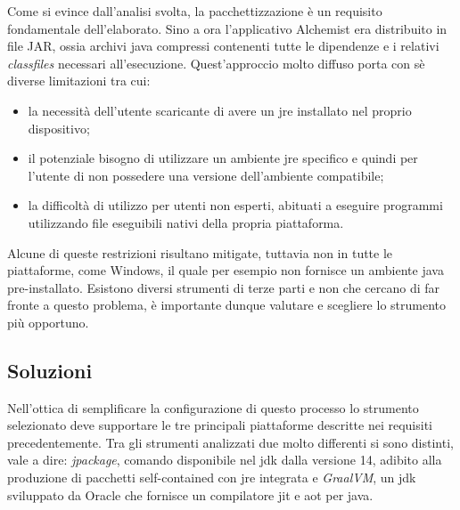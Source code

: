 Come si evince dall'analisi svolta, la pacchettizzazione è un requisito fondamentale dell'elaborato. Sino a ora l'applicativo Alchemist era distribuito in file JAR, ossia archivi java compressi contenenti tutte le dipendenze e i relativi \textit{classfiles} necessari all'esecuzione. Quest'approccio molto diffuso porta con sè diverse limitazioni tra cui:
\begin{itemize}
	\item la necessità dell'utente scaricante di avere un \ac{jre} installato nel proprio dispositivo;
	\item il potenziale bisogno di utilizzare un ambiente \ac{jre} specifico e quindi per l'utente di non possedere una versione dell'ambiente compatibile;
	\item la difficoltà di utilizzo per utenti non esperti, abituati a eseguire programmi utilizzando file eseguibili nativi della propria piattaforma.
\end{itemize}
Alcune di queste restrizioni risultano mitigate, tuttavia non in tutte le piattaforme, come Windows, il quale per esempio non fornisce un ambiente java pre-installato. Esistono diversi strumenti di terze parti e non che cercano di far fronte a questo problema, è importante dunque valutare e scegliere lo strumento più opportuno.

\subsection{Soluzioni}

Nell'ottica di semplificare la configurazione di questo processo lo strumento selezionato deve supportare le tre principali piattaforme descritte nei requisiti precedentemente. Tra gli strumenti analizzati due molto differenti si sono distinti, vale a dire: \textit{jpackage}, comando disponibile nel \ac{jdk} dalla versione 14, adibito alla produzione di pacchetti self-contained con \ac{jre} integrata e \textit{GraalVM}, un \ac{jdk} sviluppato da Oracle che fornisce un compilatore \ac{jit} e \ac{aot} per java. 

